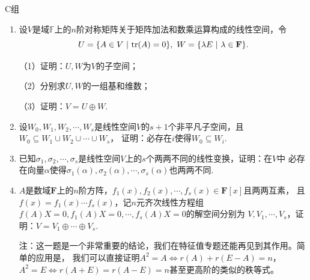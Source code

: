 \centerline{\heiti C组}
\begin{enumerate}
	\item 设$V$是域$\mathbb{F}$上的$n$阶对称矩阵关于矩阵加法和数乘运算构成的线性空间，令
	$$U=\{A\in V\ |\ \textup{tr}(A)=0\},\ W=\{\lambda E\ |\ \lambda\in\mathbf{F}\}.$$

	（1）证明：$U,W$为$V$的子空间；

	（2）分别求$U,W$的一组基和维数；

	（3）证明：$V=U\oplus W$.
	\item 设$W_0,W_1,W_2,\cdots,W_s$是线性空间$V$的$s+1$个非平凡子空间，且$W_0 \subseteq W_1 \cup W_2 \cup \cdots \cup W_s$，
	证明：必存在$i$使得$W_0\subseteq W_i$.
	\item 已知$\sigma_1,\sigma_2,\cdots,\sigma_s$是线性空间$V$上的$s$个两两不同的线性变换，证明：在$V$中
	必存在向量$\alpha$使得$\sigma_1(\alpha),\sigma_2(\alpha),\cdots,\sigma_s(\alpha)$也两两不同.
	\item $A$是数域$\mathbf{F}$上的$n$阶方阵，$f_1(x),f_2(x),\cdots,f_s(x)\in \mathbf{F}[x]$且两两互素，
	且$f(x)=f_1(x)\cdots f_s(x)$，记$n$元齐次线性方程组$f(A)X=0,f_1(A)X=0,\cdots,f_s(A)X=0$的解空间分别为
	$V,V_1,\cdots,V_s$，证明：$V=V_1\oplus\cdots\oplus V_s$.
	
	注：这一题是一个非常重要的结论，我们在特征值专题还能再见到其作用。简单的应用是，
	我们可以直接证明$A^2=A \iff r(A)+r(E-A)=n$，$A^2=E \iff r(A+E)=r(A-E)=n$甚至更高阶的类似的秩等式。
\end{enumerate}